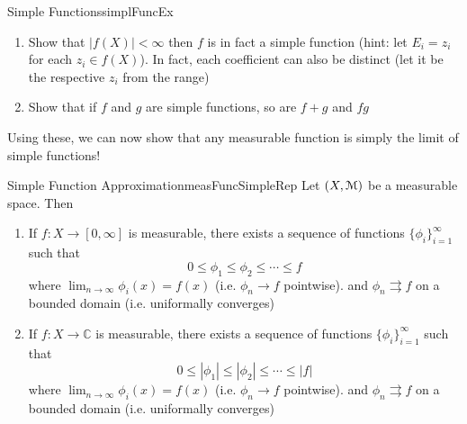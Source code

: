 \documentclass[oneside]{book}
\renewcommand{\C}{\mathbb{C}}
\newcommand{\EM}{\EuScript{M}}
\newcommand{\rw}{\rightarrow}
\begin{document}
\begin{example}{Simple Functions}{simplFuncEx}
	\begin{enumerate}
		\item Show that $|f(X)| < \infty$ then $f$ is in fact a simple function (hint: let $E_i = z_i$ for each $z_i \in f(X)$).
			In fact, each coefficient can also be distinct (let it be the respective $z_i$ from the range)
		\item Show that if $f$ and $g$ are simple functions, so are $f+g$ and $fg$ 
	\end{enumerate}
\end{example}

Using these, we can now show that any measurable function is simply the limit of simple functions!

\begin{thm}{Simple Function Approximation}{measFuncSimpleRep}
	Let $(X, \EM)$ be a measurable space. Then
	\begin{enumerate}
		\item If $f: X \rw [0,\infty]$ is measurable, there exists a sequence of functions $\{\phi_i\}_{i=1}^\infty$
			such that 
			\[
				0 \le \phi_1 \le \phi_2 \le \cdots \le f
			\]
			where $\lim_{n \rw \infty} \phi_i(x) = f(x)$ (i.e. $\phi_n \rw f$ pointwise). and $\phi_n \rightrightarrows
			f$ on a bounded domain (i.e. uniformally converges)
		\item If $f: X \rw \C$ is measurable, there exists a sequence of functions $\{\phi_i\}_{i=1}^\infty$
			such that 
			\[
				0 \le |\phi_1| \le |\phi_2| \le \cdots \le |f|
			\]
			where $\lim_{n \rw \infty} \phi_i(x) = f(x)$ (i.e. $\phi_n \rw f$ pointwise). and $\phi_n \rightrightarrows
			f$ on a bounded domain (i.e. uniformally converges)
	\end{enumerate}
\end{thm}
\end{document}
